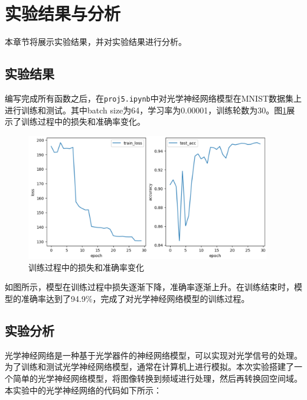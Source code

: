 \section{实验结果与分析}

本章节将展示实验结果，并对实验结果进行分析。

\subsection{实验结果}

编写完成所有函数之后，在\texttt{proj5.ipynb}中对光学神经网络模型在MNIST数据集上进行训练和测试。其中batch size为64，学习率为0.00001，训练轮数为30。图\ref{fig:loss_and_acc}展示了训练过程中的损失和准确率变化。

\begin{figure}[H]
    \centering
    \includegraphics[width=0.95\textwidth]{pics/loss_and_acc.png}
    \caption{训练过程中的损失和准确率变化}
    \label{fig:loss_and_acc}
\end{figure}

如图所示，模型在训练过程中损失逐渐下降，准确率逐渐上升。在训练结束时，模型的准确率达到了94.9\%，完成了对光学神经网络模型的训练过程。

\subsection{实验分析}

光学神经网络是一种基于光学器件的神经网络模型，可以实现对光学信号的处理。为了训练和测试光学神经网络模型，通常在计算机上进行模拟。本次实验搭建了一个简单的光学神经网络模型，将图像转换到频域进行处理，然后再转换回空间域。本实验中的光学神经网络的代码如下所示：

